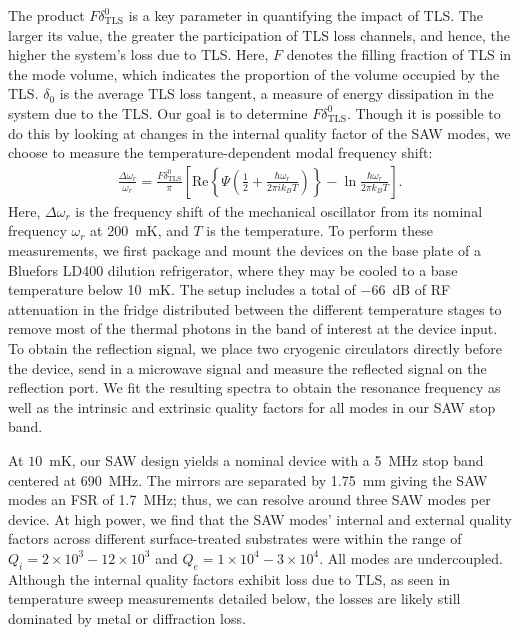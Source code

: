 \documentclass[
 prapplied,
 amsmath,amssymb,
 reprint, longbibliography, superscriptaddress
]{revtex4-2}
\begin{document}
The product \(F \delta_{\text{TLS}}^0\) is a key parameter in quantifying the impact of TLS. The larger its value, the greater the participation of TLS loss channels, and hence, the higher the system's loss due to TLS. Here, \(F\) denotes the filling fraction of TLS in the mode volume, which indicates the proportion of the volume occupied by the TLS. \(\delta_0\) is the average TLS loss tangent, a measure of energy dissipation in the system due to the TLS. Our goal is to determine  \(F \delta_{\text{TLS}}^0\). Though it is possible to do this by looking at changes in the internal quality factor of the SAW modes, we choose to measure the temperature-dependent modal frequency shift:
\begin{align}\label{eq:one}
    \!\!\!\!\!\frac{\Delta\omega_r}{\omega_r} = \frac{F\delta_{\text{TLS}}^0}{\pi}\! \left[ \text{Re}\!\left\{\!\Psi\!\left(\frac{1}{2}\!+\!\frac{\hbar\omega_r}{2\pi i k_B T}\right)\!\right\} \!-\!\ln\frac{\hbar\omega_{r}}{2\pi k_B T}\right].\!\!\!\!\!\!
\end{align}
Here, $\Delta \omega_r$ is the frequency shift of the mechanical oscillator from its nominal frequency $ \omega_r$ at 200~mK, and $T$ is the temperature. To perform these measurements, we first package and mount the devices on the base plate of a Bluefors LD400 dilution refrigerator, where they may be cooled to a base temperature below 10~mK. The setup includes a total of $-66$~dB of RF attenuation in the fridge distributed between the different temperature stages to remove most of the thermal photons in the band of interest at the device input. To obtain the reflection signal, we place two cryogenic circulators directly before the device, send in a microwave signal and measure the reflected signal on the reflection port. We fit the resulting spectra to obtain the resonance frequency as well as the intrinsic and extrinsic quality factors for all modes in our SAW stop band. 

At $10$~mK, our SAW design yields a nominal device with a 5~MHz stop band centered at 690~MHz. The mirrors are separated by 1.75~mm giving the SAW modes an FSR of 1.7~MHz; thus, we can resolve around three SAW modes per device. At high power, we find that the SAW modes' internal and external quality factors across different surface-treated substrates were within the range of $Q_i = 2\times10^3 - 12\times10^3$ and $Q_e = 1\times10^4 - 3\times10^4$. All modes are undercoupled. Although the internal quality factors exhibit loss due to TLS, as seen in temperature sweep measurements detailed below, the losses are likely still dominated by metal or diffraction loss. 
\end{document}
